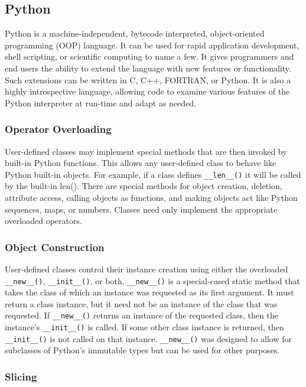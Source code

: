 \documentclass{sigplanconf}
\begin{document}
\subsection{Python}

Python \cite{Lun01,Pyt11} is a machine-independent, bytecode interpreted,
object-oriented programming (OOP) language. It can be used for rapid
application development, shell scripting, or scientific computing to name a
few. It gives programmers and end users the ability to extend the language
with new features or functionality. Such extensions can be written in C, C++,
FORTRAN, or Python. It is also a highly introspective language, allowing code
to examine various features of the Python interpreter at run-time and adapt as
needed.

\subsubsection{Operator Overloading}

User-defined classes may implement special methods that are then invoked by
built-in Python functions. This allows any user-defined class to behave like
Python built-in objects. For example, if a class defines \verb=__len__()= it
will be called by the built-in len(). There are special methods for object
creation, deletion, attribute access, calling objects as functions, and making
objects act like Python sequences, maps, or numbers. Classes need only
implement the appropriate overloaded operators.

\subsubsection{Object Construction}

User-defined classes control their instance creation using either the
overloaded \verb=__new__()=, \verb=__init__()=, or both. \verb=__new__()= is a
special-cased static method that takes the class of which an instance was
requested as its first argument. It must return a class instance, but it need
not be an instance of the class that was requested. If \verb=__new__()=
returns an instance of the requested class, then the instance’s
\verb=__init__()= is called. If some other class instance is returned, then
\verb=__init__()= is not called on that instance.  \verb=__new__()= was
designed to allow for subclasses of Python’s immutable types but can be used
for other purposes.

\subsubsection{Slicing}
\end{document}
